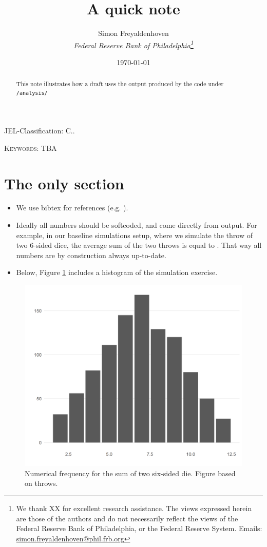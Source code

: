 \documentclass[12pt]{article}
\author{
        Simon Freyaldenhoven\\
        \textit{Federal Reserve Bank of Philadelphia\thanks{We thank XX for excellent research assistance. The views expressed herein are those of the authors and do not necessarily reflect the views of the Federal Reserve Bank of Philadelphia, or the Federal Reserve System. Emails: \href{mailto:simon.freyaldenhoven@phil.frb.org}{simon.freyaldenhoven@phil.frb.org}}}
}
\title{A quick note}
\date{\today}
\theoremstyle{definition}
\begin{document}
\maketitle

\begin{abstract}
\noindent This note illustrates how a draft uses the output produced by the code under \texttt{/analysis/}
\end{abstract}

JEL-Classification: C..

\textsc{Keywords}: TBA

\thispagestyle{empty}
\newpage

\setcounter{page}{1}

\section{The only section}

\begin{itemize}
\item We use bibtex for references (e.g. \cite{Freyaldenhoven2019}). 

\item Ideally all numbers should be softcoded, and come directly from output. For example, in our baseline simulations setup, where we simulate the throw of two 6-sided dice, the average sum of the two throws is equal to \unskip. That way all numbers are by construction always up-to-date.

\item Below, Figure \ref{fig:hist_baseline} includes a histogram of the simulation exercise.
\end{itemize}

\begin{figure}[tbh!]
\centering
\includegraphics[width=.8\linewidth]{baseline/hist.png}
\caption[]{Numerical frequency for the sum of two six-sided die. Figure based on throws.}
\label{fig:hist_baseline}
\end{figure}
\end{document}
